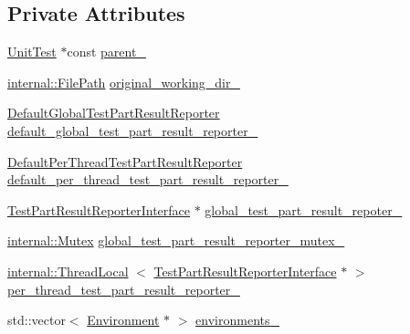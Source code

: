 \subsection*{\-Private \-Attributes}
\begin{DoxyCompactItemize}
\item 
\hyperlink{classtesting_1_1UnitTest}{\-Unit\-Test} $\ast$const \hyperlink{classtesting_1_1internal_1_1UnitTestImpl_a83d5f098f3d26888da5c556f26076159}{parent\-\_\-}
\item 
\hyperlink{classtesting_1_1internal_1_1FilePath}{internal\-::\-File\-Path} \hyperlink{classtesting_1_1internal_1_1UnitTestImpl_a31c402be948f2244efdda0e5f38fab0e}{original\-\_\-working\-\_\-dir\-\_\-}
\item 
\hyperlink{classtesting_1_1internal_1_1DefaultGlobalTestPartResultReporter}{\-Default\-Global\-Test\-Part\-Result\-Reporter} \hyperlink{classtesting_1_1internal_1_1UnitTestImpl_a1e540a0eaad5aeab8523776cca9af7d2}{default\-\_\-global\-\_\-test\-\_\-part\-\_\-result\-\_\-reporter\-\_\-}
\item 
\hyperlink{classtesting_1_1internal_1_1DefaultPerThreadTestPartResultReporter}{\-Default\-Per\-Thread\-Test\-Part\-Result\-Reporter} \hyperlink{classtesting_1_1internal_1_1UnitTestImpl_a28c00f393c9383c17bd12ed8f18ed241}{default\-\_\-per\-\_\-thread\-\_\-test\-\_\-part\-\_\-result\-\_\-reporter\-\_\-}
\item 
\hyperlink{classtesting_1_1TestPartResultReporterInterface}{\-Test\-Part\-Result\-Reporter\-Interface} $\ast$ \hyperlink{classtesting_1_1internal_1_1UnitTestImpl_a733fa2b39275ffbabc99d121d88dff5c}{global\-\_\-test\-\_\-part\-\_\-result\-\_\-repoter\-\_\-}
\item 
\hyperlink{classtesting_1_1internal_1_1Mutex}{internal\-::\-Mutex} \hyperlink{classtesting_1_1internal_1_1UnitTestImpl_a44a033b8d726114e3fb407ec77c9e409}{global\-\_\-test\-\_\-part\-\_\-result\-\_\-reporter\-\_\-mutex\-\_\-}
\item 
\hyperlink{classtesting_1_1internal_1_1ThreadLocal}{internal\-::\-Thread\-Local}\*
$<$ \hyperlink{classtesting_1_1TestPartResultReporterInterface}{\-Test\-Part\-Result\-Reporter\-Interface} $\ast$ $>$ \hyperlink{classtesting_1_1internal_1_1UnitTestImpl_a2f151c72a75fa55edeca99b3deb451e4}{per\-\_\-thread\-\_\-test\-\_\-part\-\_\-result\-\_\-reporter\-\_\-}
\item 
std\-::vector$<$ \hyperlink{classtesting_1_1Environment}{\-Environment} $\ast$ $>$ \hyperlink{classtesting_1_1internal_1_1UnitTestImpl_a3887eb0491f4d2221cd010aff0e9c4b6}{environments\-\_\-}

\end{DoxyCompactItemize}
